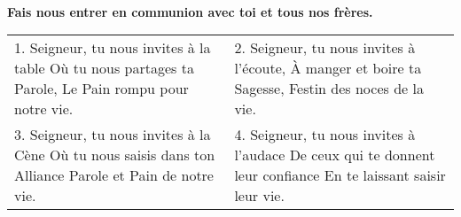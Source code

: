 \\
\textbf{Fais nous entrer en communion avec toi et tous nos frères.}


\begin{tabular}{p{} p{}}
 1. Seigneur, tu nous invites à la table \newline
 Où tu nous partages ta Parole,\newline
 Le Pain rompu pour notre vie.
&
 2. Seigneur, tu nous invites à l’écoute,\newline
 À manger et boire ta Sagesse,\newline
 Festin des noces de la vie. 
\\
3. Seigneur, tu nous invites à la Cène \newline
Où tu nous saisis dans ton Alliance\newline
Parole et Pain de notre vie. 
&
4. Seigneur, tu nous invites à l'audace\newline
De ceux qui te donnent leur confiance\newline
En te laissant saisir leur vie.
\end{tabular}
